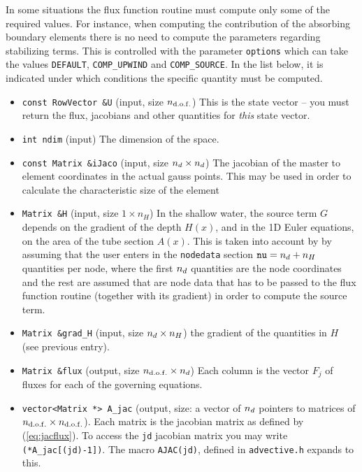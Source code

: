 In some situations the flux function routine must compute only some of
the required values. For instance, when computing the contribution of
the absorbing boundary elements there is no need to compute the
parameters regarding stabilizing terms. This is controlled with the
parameter \verb+options+ which can take the values \verb+DEFAULT+,
\verb+COMP_UPWIND+ and \verb+COMP_SOURCE+. In the list below, it is
indicated under which conditions the specific quantity must be
computed. 

%
{\raggedright
\begin{itemize}
\item\verb+const RowVector &U+ (input, size ${n_{\mathrm{d.o.f.}}}$)
   This is the state vector -- you must return the flux, jacobians and
other quantities for \emph{this} state vector. 

\item\verb+int ndim+ (input) The dimension of the space. 

\item\verb+const Matrix &iJaco+ (input, size ${n_d}\times{n_d}$) 
The jacobian of the master
to element coordinates in the actual gauss points. This may be used in
order to calculate the characteristic size of the element

\item\verb+Matrix &H+ (input, size $1\times n_H$) In the shallow
water, the source term $G$ depends on the gradient of the depth
$H(x)$, and in the 1D Euler equations, on the area of the tube section
$A(x)$. This is taken into account by \pfem{} by assuming that the
user enters in the \verb+nodedata+ section ${\tt nu}={n_d}+n_H$
quantities per node, where the first ${n_d}$ quantities are the node
coordinates and the rest are assumed that are node data that has to be
passed to the flux function routine (together with its gradient) in
order to compute the source term.

\item\verb+Matrix &grad_H+ (input, size ${n_d}\times n_H$) the
gradient of the quantities in $H$ (see previous entry). 

\item\verb+Matrix &flux+ (output, size ${n_{\mathrm{d.o.f.}}}\times{n_d}$) Each
column is the vector $F_j$ of fluxes for each of the governing
equations. 

\item\verb+vector<Matrix *> A_jac+ (output, size: a vector of
${n_d}$ pointers to matrices of ${n_{\mathrm{d.o.f.}}}\times{n_{\mathrm{d.o.f.}}}$). Each matrix is
the jacobian matrix as defined by (\ref{eq:jacflux}). To access the
\verb+jd+ jacobian matrix  you may write \verb+(*A_jac[(jd)-1])+. The
macro \verb+AJAC(jd)+, defined in \verb+advective.h+  expands to this. 


\end{itemize}}
